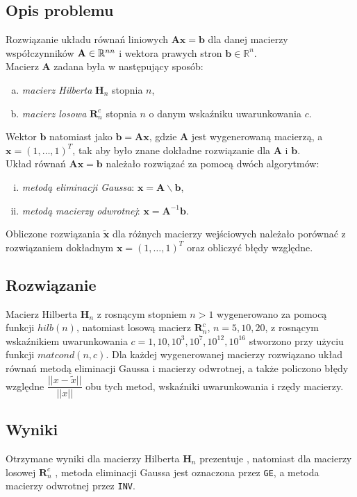 \documentclass[11pt]{mk-polish-lab-report}
\let\times\relax%
\DeclareMathOperator{\times}{\cdot}
\begin{document}
\subsection{Opis problemu}

Rozwiązanie układu równań liniowych $\mathbf{Ax} = \mathbf{b}$ dla danej macierzy współczynników $\mathbf{A} \in \mathbb{R}^{n\times n}$ i wektora prawych stron $\mathbf{b} \in \mathbb{R}^n$. \\
Macierz $\mathbf{A}$ zadana była w następujący sposób:
\begin{enumerate}[(a)]
\item \emph{macierz Hilberta} $\mathbf{H}_n$ stopnia $n$,
\item \emph{macierz losowa} $\mathbf{R}_n^c$ stopnia $n$ o danym wskaźniku uwarunkowania $c$.
\end{enumerate}
Wektor $\mathbf{b}$ natomiast jako $\mathbf{b} = \mathbf{Ax}$, gdzie $\mathbf{A}$ jest wygenerowaną macierzą, a $\mathbf{x} = (1, \dots, 1)^{T}$, tak aby było znane dokładne rozwiązanie dla $\mathbf{A}$ i $\mathbf{b}$. \\
Układ równań $\mathbf{Ax} = \mathbf{b}$ należało rozwiązać za pomocą dwóch algorytmów:
\begin{enumerate}[(i)]
\item \emph{metodą eliminacji Gaussa}: $\mathbf{x} = \mathbf{A} \backslash \mathbf{b}$,
\item \emph{metodą macierzy odwrotnej}: $\mathbf{x} = \mathbf{A}^{-1}\mathbf{b}$.
\end{enumerate}
Obliczone rozwiązania $\mathbf{\tilde{x}}$ dla różnych macierzy wejściowych należało porównać z rozwiązaniem dokładnym $\mathbf{x} = (1, \dots, 1)^{T}$ oraz obliczyć błędy względne. 


\subsection{Rozwiązanie}

Macierz Hilberta $\mathbf{H}_n$ z rosnącym stopniem $n > 1$ wygenerowano za pomocą funkcji $hilb(n)$, natomiast losową macierz $\mathbf{R}_n^c$, $n = 5,10,20$, z rosnącym wskaźnikiem uwarunkowania $c=1,10,10^3,10^7,10^{12},10^{16}$ stworzono przy użyciu funkcji $matcond(n, c)$. Dla każdej wygenerowanej macierzy rozwiązano układ równań metodą eliminacji Gaussa i macierzy odwrotnej, a także policzono błędy względne $\dfrac{||x - \tilde{x}||}{||x||}$ obu tych metod, wskaźniki uwarunkowania i rzędy macierzy.

\subsection{Wyniki}
Otrzymane wyniki dla macierzy Hilberta $\mathbf{H}_n$ prezentuje , natomiast dla macierzy losowej $\mathbf{R}_n^c$ , metoda eliminacji Gaussa jest oznaczona przez \texttt{GE}, a metoda macierzy odwrotnej przez \texttt{INV}.
\end{document}
